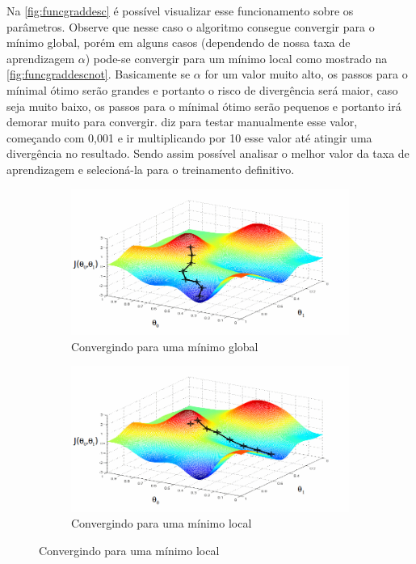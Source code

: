 Na \autoref{fig:funcgraddesc} é possível visualizar esse funcionamento sobre os parâmetros. Observe que nesse caso o algoritmo consegue convergir para o mínimo global, porém em alguns casos (dependendo de nossa taxa de aprendizagem $ \alpha $) pode-se convergir para um mínimo local como mostrado na \autoref{fig:funcgraddescnot}. Basicamente se $\alpha$ for um valor muito alto, os passos para o mínimal ótimo serão grandes e portanto o risco de divergência será maior, caso seja muito baixo, os passos para o mínimal ótimo serão pequenos e portanto irá demorar muito para convergir.  diz para testar manualmente esse valor, começando com 0,001 e ir multiplicando por 10 esse valor até atingir uma divergência no resultado. Sendo assim possível analisar o melhor valor da taxa de aprendizagem e selecioná-la para o treinamento definitivo.

\begin{figure}
  \caption{Funcionamento do Gradiente Descendente}
  \begin{subfigure}[htb]{0.5\textwidth} 
    \includegraphics[width=\textwidth]{img/funcgraddesc1}
    \caption{Convergindo para uma mínimo global} \label{fig:funcgraddesc}
  \end{subfigure}
  \begin{subfigure}[htb]{0.5\textwidth} 
    \includegraphics[width=\textwidth]{img/funcgraddesc2}
    \caption{Convergindo para uma mínimo local} \label{fig:funcgraddescnot}
  \end{subfigure}

\end{figure}

